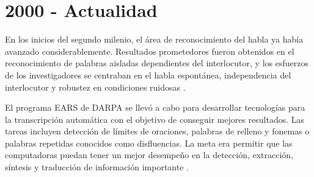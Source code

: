 \section{2000 - Actualidad}
\label{sec:post2000s}


En los inicios del segundo milenio, el \'{a}rea de reconocimiento del habla ya hab\'{i}a avanzado 
considerablemente. Resultados prometedores fueron obtenidos en el reconocimiento de palabras aisladas
dependientes del interlocutor, y los esfuerzos de los investigadores se centraban en el habla espont\'{a}nea,
independencia del interlocutor y robustez en condiciones ruidosas \cite{RonzhinSurvey2006}.

El programa EARS de DARPA se llev\'{o} a cabo para desarrollar tecnolog\'{i}as para la transcripci\'{o}n 
autom\'{a}tica con el objetivo de conseguir mejores resultados. 
Las tareas incluyen detecci\'{o}n de l\'{i}mites de oraciones, palabras de relleno 
y fonemas o palabras repetidas conocidos como disfluencias. 
La meta era permitir que las computadoras puedan tener un mejor desempe\~{n}o en la detecci\'{o}n, extracci\'{o}n, 
s\'{i}ntesis y traducci\'{o}n de informaci\'{o}n importante \cite{LiuStructural2005, SoltauTheIBM2005}.

